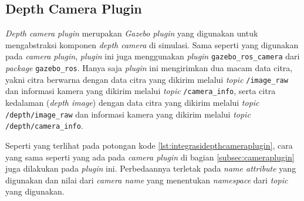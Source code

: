 \subsection{Depth Camera Plugin}
\label{subsec:depthcameraplugin}

\emph{Depth camera plugin} merupakan \emph{Gazebo plugin} yang digunakan untuk mengabstraksi komponen \emph{depth camera} di simulasi.
Sama seperti yang digunakan pada \emph{camera plugin},
  \emph{plugin} ini juga menggunakan \emph{plugin} \lstinline{gazebo_ros_camera} dari \emph{package} \lstinline{gazebo_ros}.
Hanya saja \emph{plugin} ini mengirimkan dua macam data citra,
  yakni citra berwarna dengan data citra yang dikirim melalui \emph{topic} \lstinline{/image_raw} dan informasi kamera yang dikirim melalui \emph{topic} \lstinline{/camera_info},
  serta citra kedalaman (\emph{depth image}) dengan data citra yang dikirim melalui \emph{topic} \lstinline{/depth/image_raw} dan informasi kamera yang dikirim melalui \emph{topic} \lstinline{/depth/camera_info}.



Seperti yang terlihat pada potongan kode \ref{lst:integrasidepthcameraplugin},
  cara yang sama seperti yang ada pada \emph{camera plugin} di bagian \ref{subsec:cameraplugin} juga dilakukan pada \emph{plugin} ini.
Perbedaannya terletak pada \emph{name attribute} yang digunakan dan nilai dari \emph{camera name} yang menentukan \emph{namespace} dari \emph{topic} yang digunakan.
